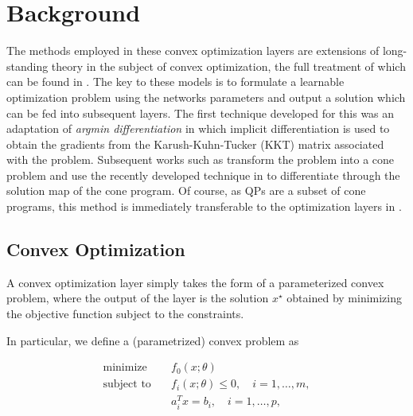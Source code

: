 \documentclass{article}
\begin{document}
\section{Background}

The methods employed in these convex optimization layers are extensions of long-standing theory in the subject of convex optimization, the full treatment of which can be found in \citep{boyd2004convex}. The key to these models is to formulate a learnable optimization problem using the networks parameters and output a solution which can be fed into subsequent layers. The first technique developed for this was an adaptation of \textit{argmin differentiation} in which implicit differentiation is used to obtain the gradients from the Karush-Kuhn-Tucker (KKT) matrix associated with the problem. Subsequent works such as \citep{differentiableconvexoptimizationlayers} transform the problem into a cone problem and use the recently developed technique in \citep{conedifferentiation} to differentiate through the solution map of the cone program. Of course, as QPs are a subset of cone programs, this method is immediately transferable to the optimization layers in \citep{optnet}.

\subsection{Convex Optimization}

A convex optimization layer simply takes the form of a parameterized convex problem, where the output of the layer is the solution \(x^\star\) obtained by minimizing the objective function subject to the constraints.

In particular, we define a (parametrized) convex problem as

\begin{equation}
\begin{aligned}
    \text{minimize} \quad & f_0(x; \theta) \\
    \text{subject to} \quad & f_i(x; \theta) \leq 0, \quad i = 1, \ldots, m, \\
    & a_i^T x = b_i, \quad i = 1, \ldots, p,
\end{aligned}
\end{equation}
\end{document}
